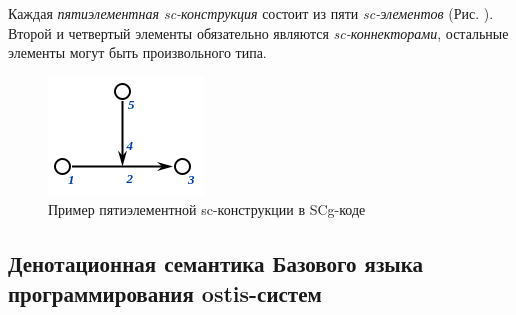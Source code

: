 Каждая \textit{пятиэлементная sc-конструкция} состоит из пяти \textit{sc-элементов} (Рис. \textit{}). Второй и четвертый элементы обязательно являются \textit{sc-коннекторами}, остальные элементы могут быть произвольного типа.

\begin{figure}[H]
	\centering
	\includegraphics[scale=0.8]{images/part3/chapter_situation_management/pic_ps4.png}
	\caption{Пример пятиэлементной sc-конструкции в SCg-коде}
	\label{fig:pic_ps4}
\end{figure}

\subsection{Денотационная семантика Базового языка программирования ostis-систем}

